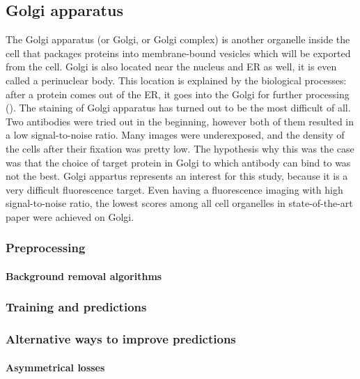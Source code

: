 \subsection{Golgi apparatus}
    The Golgi apparatus (or Golgi, or Golgi complex) is another organelle inside the cell that packages proteins into membrane-bound vesicles which will be exported from the cell. Golgi is also located near the nucleus and ER as well, it is even called a perinuclear body. This location is explained by the biological processes: after a protein comes out of the ER, it goes into the Golgi for further processing (\cite{golgi}). The staining of Golgi apparatus has turned out to be the most difficult of all. Two antibodies were tried out in the beginning, however both of them resulted in a low signal-to-noise ratio. Many images were underexposed, and the density of the cells after their fixation was pretty low. The hypothesis why this was the case was that the choice of target protein in Golgi to which antibody can bind to was not the best. Golgi appartus represents an interest for this study, because it is a very difficult fluorescence target. Even having a fluorescence imaging with high signal-to-noise ratio, the lowest scores among all cell organelles in state-of-the-art paper \cite{Cheng_2021} were achieved on Golgi.
    \subsubsection{Preprocessing}
        
        \paragraph{Background removal algorithms}
            \label{par:background-removal}
            
    \subsubsection{Training and predictions}
        

    \subsubsection{Alternative ways to improve predictions}
        \paragraph{Asymmetrical losses}
            
